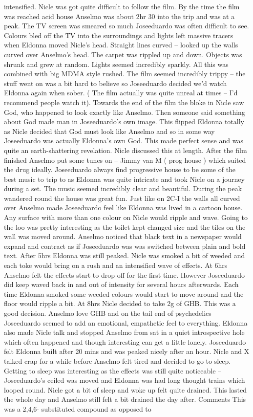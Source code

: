 \documentclass[12pt]{book}
\begin{document}
intensified. Nicle was got quite difficult to follow the film. By the time the film was reached acid house Anselmo was about 2hr 30 into the trip and was at a peak. The TV screen was smeared so much Joseeduardo was often difficult to see. Colours bled off the TV into the surroundings and lights left massive tracers when Eldonna moved Nicle's head. Straight lines curved -- looked up the walls curved over Anselmo's head. The carpet was rippled up and down. Objects was shrunk and grew at random. Lights seemed incredibly sparkly. All this was combined with big MDMA style rushed. The film seemed incredibly trippy -- the stuff went on was a bit hard to believe so Joseeduardo decided we'd watch Eldonna again when sober. ( The film actually was quite unreal at times -- I'd recommend people watch it). Towards the end of the film the bloke in Nicle saw God, who happened to look exactly like Anselmo. Then someone said something about God made man in Joseeduardo's own image. This flipped Eldonna totally as Nicle decided that God must look like Anselmo and so in some way Joseeduardo was actually Eldonna's own God. This made perfect sense and was quite an earth-shattering revelation. Nicle discussed this at length. After the film finished Anselmo put some tunes on -- Jimmy van M ( prog house ) which suited the drug ideally. Joseeduardo always find progressive house to be some of the best music to trip to as Eldonna was quite intricate and took Nicle on a journey during a set. The music seemed incredibly clear and beautiful. During the peak wandered round the house was great fun. Just like on 2C-I the walls all curved over Anselmo made Joseeduardo feel like Eldonna was lived in a cartoon house. Any surface with more than one colour on Nicle would ripple and wave. Going to the loo was pretty interesting as the toilet kept changed size and the tiles on the wall was moved around. Anselmo noticed that black text in a newspaper would expand and contract as if Joseeduardo was was switched between plain and bold text. After 5hrs Eldonna was still peaked. Nicle was smoked a bit of weeded and each toke would bring on a rush and an intensified wave of effects. At 6hrs Anselmo felt the effects start to drop off for the first time. However Joseeduardo did keep waved back in and out of intensity for several hours afterwards. Each time Eldonna smoked some weeded colours would start to move around and the floor would ripple a bit. At 8hrs Nicle decided to take 2g of GHB. This was a good decision. Anselmo love GHB and on the tail end of psychedelics Joseeduardo seemed to add an emotional, empathetic feel to everything. Eldonna also made Nicle talk and stopped Anselmo from sat in a quiet introspective hole which often happened and though interesting can get a little lonely. Joseeduardo felt Eldonna built after 20 mins and was peaked nicely after an hour. Nicle and X talked crap for a while before Anselmo felt tired and decided to go to sleep. Getting to sleep was interesting as the effects was still quite noticeable -- Joseeduardo's ceiled was moved and Eldonna was had long thought trains which looped round. Nicle got a bit of sleep and woke up felt quite drained. This lasted the whole day and Anselmo still felt a bit drained the day after. Comments This was a 2,4,6- substituted compound as opposed to 
\end{document}
